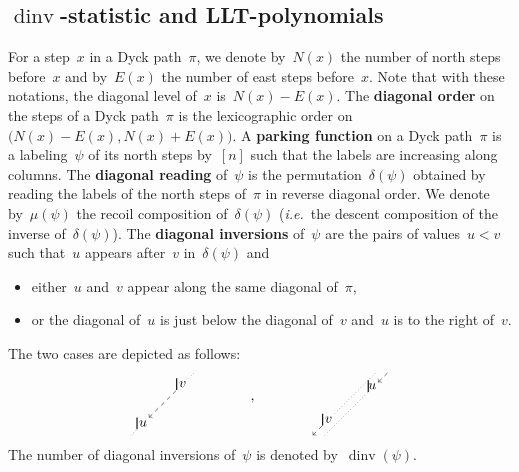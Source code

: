 \documentclass{amsart}
\theoremstyle{definition}
\newcommand{\ie}{\textit{i.e.}~} %
\newcommand{\defn}[1]{\textbf{\textsf{\color{PineGreen} #1}}} %
\newcommand{\dinv}{\operatorname{dinv}} %
\begin{document}

\subsection{$\dinv$-statistic and LLT-polynomials}

For a step~$x$ in a Dyck path~$\pi$, we denote by~$N(x)$ the number of north steps before~$x$ and by~$E(x)$ the number of east steps before~$x$.
Note that with these notations, the diagonal level of~$x$ is~$N(x)-E(x)$.
The \defn{diagonal order} on the steps of a Dyck path~$\pi$ is the lexicographic order on~$\big( N(x) - E(x), N(x) + E(x) \big)$.
A \defn{parking function} on a Dyck path~$\pi$ is a labeling~$\psi$ of its north steps by~$[n]$ such that the labels are increasing along columns.
The \defn{diagonal reading} of~$\psi$ is the permutation~$\delta(\psi)$ obtained by reading the labels of the north steps of~$\pi$ in reverse diagonal order.
We denote by~$\mu(\psi)$ the recoil composition of~$\delta(\psi)$ (\ie the descent composition of the inverse of~$\delta(\psi)$).
The \defn{diagonal inversions} of~$\psi$ are the pairs of values~$u < v$ such that~$u$ appears after~$v$ in~$\delta(\psi)$ and 
\begin{itemize}
\item either~$u$ and~$v$ appear along the same diagonal of~$\pi$,
\item or the diagonal of~$u$ is just below the diagonal of~$v$ and~$u$ is to the right of~$v$.
\end{itemize}
The two cases are depicted as follows:
\begin{equation}\label{eq:diag_inv}
   \begin{tikzpicture}[scale=.5,baseline=.6cm]
      \node at (2,2)  {$v$};
      \node at (0,0)  {$u$};
      \draw[thick] (1.7,1.7) -- (1.7,2.3);
      \draw[thick] (-.3,-.3) -- (-.3,.3);
      \draw[dashed,<-] (.3,.3) -- (1.7,1.7);
      \draw[dotted,-] (-.6,-.6) -- (-.3,-.3);
      \draw[dotted,-] (2.3,2.3) -- (2.6,2.6);
    \end{tikzpicture}
\qquad\qquad,\qquad\qquad
   \begin{tikzpicture}[scale=.5,baseline=.6cm]
      \node at (.2,.2)  {$v$};
      \node at (2.4,1.9)  {$u$};
      \draw[dotted,-] (.5,.5) -- (2.6,2.6);
      \draw[thick] (-.1,-.1) -- (-.1,.5);
      \draw[thick] (2.2,1.6) -- (2.2,2.2);
      \draw[dashed,<-] (-.6,-.6) -- (-.1,-.1);
      \draw[dashed,<-] (2.7,2.1) -- (3.2,2.6);
      \draw[dotted,-] (0,-.6) -- (2.2,1.6);
    \end{tikzpicture}
\end{equation}
The number of diagonal inversions of~$\psi$ is denoted by~$\dinv(\psi)$.
\end{document}
